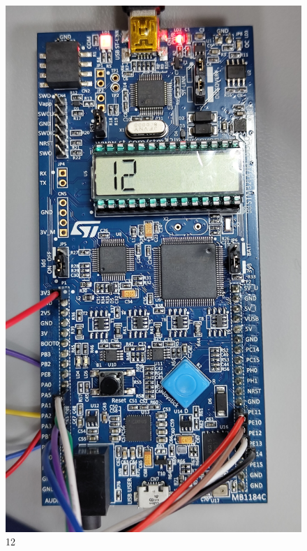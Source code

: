 \documentclass[12pt]{article}
\begin{document}
\begin{figure}[h!]
\begin{minipage}{0.45\textwidth}
    \includegraphics[width=\textwidth]{12.jpg}
    \caption{12}
\end{minipage}
    \hfill
    \end{figure}
\end{document}
